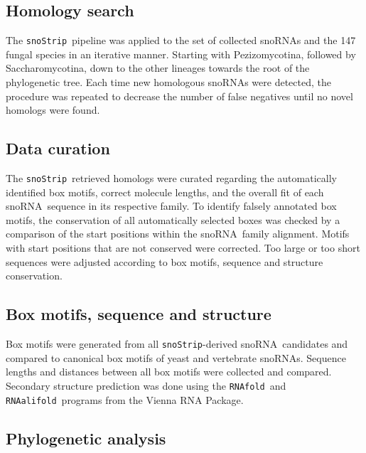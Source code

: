 \documentclass[preprint,3p,times,twocolumn]{elsarticle}
\newcommand{\sno}{snoRNA}
\newcommand{\snostrip}{\texttt{snoStrip}}
\newcommand{\fold}{\texttt{RNAfold}}
\newcommand{\alifold}{\texttt{RNAalifold}}
\begin{document}
\subsection{Homology search}

The \snostrip\ pipeline was applied to the set of collected snoRNAs and the 147 fungal species in an iterative manner. Starting with Pezizomycotina, followed by Saccharomycotina, down to the other lineages towards the root of the phylogenetic tree. Each time new homologous snoRNAs were detected, the procedure was repeated to decrease the number of false negatives until no novel homologs were found.

\subsection{Data curation}

The \snostrip\ retrieved homologs were curated regarding the automatically identified box motifs, correct molecule lengths, and the overall fit of each \sno\ sequence in its respective family. 
To identify falsely annotated box motifs, the conservation
of all automatically selected  boxes was checked by a comparison
of the start positions within the \sno\ family alignment. Motifs with start positions that are not conserved were corrected. 
Too large or too short sequences were adjusted according to box motifs, sequence and structure conservation. 

\subsection{Box motifs, sequence and structure}

Box motifs were generated from all \snostrip-derived \sno\ candidates and compared to canonical box motifs of yeast and vertebrate snoRNAs. 
Sequence lengths and distances between all box motifs were collected and compared. Secondary structure prediction was done using the \fold\ and \alifold\ programs from the Vienna RNA Package\cite{Hofacker:1994}. 

\subsection{Phylogenetic analysis}
\end{document}
